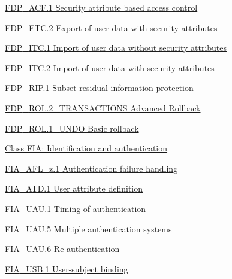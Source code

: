 \documentclass[10pt,a4paper,english]{article}
\begin{document}
\begin{list}{}{}
\begin{list}{}{}
\begin{list}{}{}
\begin{list}{}{}
\begin{list}{}{}
\item {} \href{\#fdp-acf-1-security-attribute-based-access-control}{FDP{\_}ACF.1 Security attribute based access control}

\item {} \href{\#fdp-etc-2-export-of-user-data-with-security-attributes}{FDP{\_}ETC.2 Export of user data with security attributes}

\item {} \href{\#fdp-itc-1-import-of-user-data-without-security-attributes}{FDP{\_}ITC.1 Import of user data without security attributes}

\item {} \href{\#fdp-itc-2-import-of-user-data-with-security-attributes}{FDP{\_}ITC.2 Import of user data with security attributes}

\item {} \href{\#fdp-rip-1-subset-residual-information-protection}{FDP{\_}RIP.1 Subset residual information protection}

\item {} \href{\#fdp-rol-2-transactions-advanced-rollback}{FDP{\_}ROL.2{\_}TRANSACTIONS Advanced Rollback}

\item {} \href{\#fdp-rol-1-undo-basic-rollback}{FDP{\_}ROL.1{\_}UNDO Basic rollback}

\end{list}

\item {} \href{\#class-fia-identification-and-authentication}{Class FIA: Identification and authentication}
\begin{list}{}{}
\item {} \href{\#fia-afl-z-1-authentication-failure-handling}{FIA{\_}AFL{\_}z.1 Authentication failure handling}

\item {} \href{\#fia-atd-1-user-attribute-definition}{FIA{\_}ATD.1 User attribute definition}

\item {} \href{\#fia-uau-1-timing-of-authentication}{FIA{\_}UAU.1 Timing of authentication}

\item {} \href{\#fia-uau-5-multiple-authentication-systems}{FIA{\_}UAU.5 Multiple authentication systems}

\item {} \href{\#fia-uau-6-re-authentication}{FIA{\_}UAU.6 Re-authentication}

\item {} \href{\#fia-usb-1-user-subject-binding}{FIA{\_}USB.1 User-subject binding}


\end{list}
\end{list}
\end{list}
\end{list}
\end{list}
\end{document}
